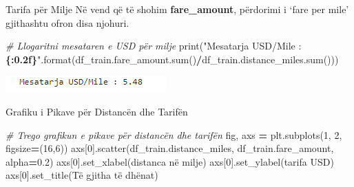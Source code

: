 \documentclass[
  ignorenonframetext,
]{beamer}
\newenvironment{Shaded}{\begin{snugshade}}{\end{snugshade}}
\newcommand{\BuiltInTok}[1]{#1}
\newcommand{\CommentTok}[1]{\textcolor[rgb]{0.56,0.35,0.01}{\textit{#1}}}
\newcommand{\DecValTok}[1]{\textcolor[rgb]{0.00,0.00,0.81}{#1}}
\newcommand{\FloatTok}[1]{\textcolor[rgb]{0.00,0.00,0.81}{#1}}
\newcommand{\NormalTok}[1]{#1}
\newcommand{\OperatorTok}[1]{\textcolor[rgb]{0.81,0.36,0.00}{\textbf{#1}}}
\newcommand{\SpecialCharTok}[1]{\textcolor[rgb]{0.81,0.36,0.00}{\textbf{#1}}}
\newcommand{\StringTok}[1]{\textcolor[rgb]{0.31,0.60,0.02}{#1}}
\begin{document}
\begin{frame}[fragile]{Tarifa për Milje}
\protect\hypertarget{tarifa-puxebr-milje}{}
Në vend që të shohim \textbf{fare\_amount}, përdorimi i `fare per mile'
gjithashtu ofron disa njohuri.


\begin{Shaded}
\begin{Highlighting}[]
\CommentTok{\# Llogaritni mesataren e USD për milje}
\BuiltInTok{print}\NormalTok{(}\StringTok{"Mesatarja USD/Mile : }\SpecialCharTok{\{:0.2f\}}\StringTok{"}\NormalTok{.}\BuiltInTok{format}\NormalTok{(df\_train.fare\_amount.}\BuiltInTok{sum}\NormalTok{()}\OperatorTok{/}\NormalTok{df\_train.distance\_miles.}\BuiltInTok{sum}\NormalTok{()))}
\end{Highlighting}
\end{Shaded}

\includegraphics{./Figs/train23.png}
\end{frame}

\begin{frame}[fragile]{Grafiku i Pikave për Distancën dhe Tarifën}
\protect\hypertarget{grafiku-i-pikave-puxebr-distancuxebn-dhe-tarifuxebn}{}

\begin{Shaded}
\begin{Highlighting}[]
\CommentTok{\# Trego grafikun e pikave për distancën dhe tarifën}
\NormalTok{fig, axs }\OperatorTok{=}\NormalTok{ plt.subplots(}\DecValTok{1}\NormalTok{, }\DecValTok{2}\NormalTok{, figsize}\OperatorTok{=}\NormalTok{(}\DecValTok{16}\NormalTok{,}\DecValTok{6}\NormalTok{))}
\NormalTok{axs[}\DecValTok{0}\NormalTok{].scatter(df\_train.distance\_miles, df\_train.fare\_amount, alpha}\OperatorTok{=}\FloatTok{0.2}\NormalTok{)}
\NormalTok{axs[}\DecValTok{0}\NormalTok{].set\_xlabel(}\StringTok{\textquotesingle{}distanca në milje\textquotesingle{}}\NormalTok{)}
\NormalTok{axs[}\DecValTok{0}\NormalTok{].set\_ylabel(}\StringTok{\textquotesingle{}tarifa USD\textquotesingle{}}\NormalTok{)}
\NormalTok{axs[}\DecValTok{0}\NormalTok{].set\_title(}\StringTok{\textquotesingle{}Të gjitha të dhënat\textquotesingle{}}\NormalTok{)}
\end{Highlighting}
\end{Shaded}
\end{frame}
\end{document}
